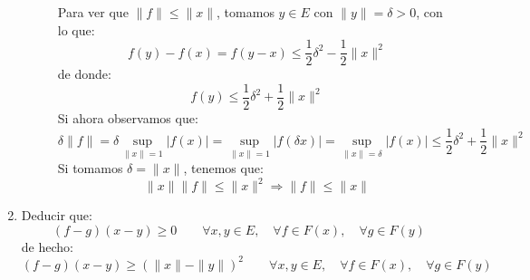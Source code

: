 \begin{ejercicio}
\begin{enumerate}[label=\alph*)]
\begin{description}
                    Para ver que $\|f\|\leq \|x\|$, tomamos $y\in E$ con $\|y\| = \delta>0$, con lo que:
                    \begin{equation*}
                        f(y)-f(x) = f(y-x) \leq \dfrac{1}{2}\delta^2 - \dfrac{1}{2}\|x\|^2
                    \end{equation*}
                    de donde:
                    \begin{equation*}
                        f(y) \leq \dfrac{1}{2}\delta^2 +\dfrac{1}{2}\|x\|^2
                    \end{equation*}
                    Si ahora observamos que:
                    \begin{equation*}
                        \delta\|f\| = \delta\sup_{\|x\|=1}|f(x)| = \sup_{\|x\| =1}|f(\delta x)| = \sup_{\|x\| = \delta}|f(x)| \leq \dfrac{1}{2}\delta^2 + \dfrac{1}{2}\|x\|^2
                    \end{equation*}
                    Si tomamos $\delta=\|x\|$, tenemos que:
                    \begin{equation*}
                        \|x\|\|f\| \leq \|x\|^2 \Longrightarrow \|f\|\leq \|x\|
                    \end{equation*}
            \end{description}
        \item Deducir que:
            \begin{equation*}
                (f-g)(x-y) \geq 0 \qquad \forall x,y\in E, \quad \forall f\in F(x), \quad \forall g\in F(y)
            \end{equation*}
            de hecho:
            \begin{equation*}
                (f-g)(x-y) \geq {(\|x\|- \|y\|)}^{2} \qquad \forall x,y\in E, \quad \forall f\in F(x), \quad \forall g\in F(y)
            \end{equation*}


\end{enumerate}
\end{ejercicio}
